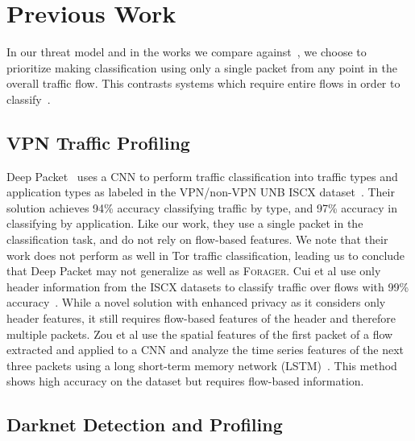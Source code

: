 \section{Previous Work}

In our threat model and in the works we compare against~\cite{choorod2022tor, didarknet, deeppacket}, we choose to prioritize making classification using only a single packet from any point in the overall traffic flow. This contrasts systems which require entire flows in order to classify~\cite{perera2017comparison, deeppacket, panchenko2011website, amaral2016machine, cao2014survey}.

\subsection{VPN Traffic Profiling}
Deep Packet~\cite{deeppacket} uses a CNN to perform traffic classification into traffic types and application types as labeled in the VPN/non-VPN UNB ISCX dataset~\cite{vpn-dataset}. Their solution achieves 94\% accuracy classifying traffic by type, and 97\% accuracy in classifying by application. Like our work, they use a single packet in the classification task, and do not rely on flow-based features. We note that their work does not perform as well in Tor traffic classification, leading us to conclude that Deep Packet may not generalize as well as \textsc{Forager}. Cui et al use only header information from the ISCX datasets to classify traffic over flows with 99\% accuracy~\cite{onlyheader}. While a novel solution with enhanced privacy as it considers only header features, it still requires flow-based features of the header and therefore multiple packets. Zou et al use the spatial features of the first packet of a flow extracted and applied to a CNN and analyze the time series features of the next three packets using a long short-term memory network (LSTM)~\cite{zhou2018encrypted}. This method shows high accuracy on the dataset but requires flow-based information.

\subsection{Darknet Detection and Profiling}

